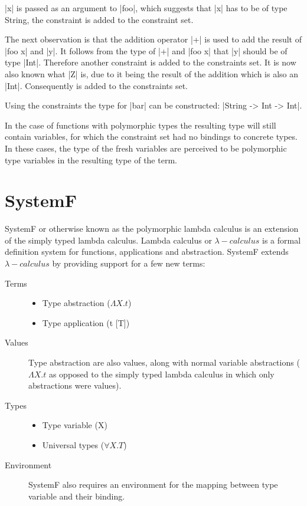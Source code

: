 |x| is passed as an argument to |foo|, which suggests that |x| has to be of type String, the constraint  is added to the constraint set.

The next observation is that the addition operator |+| is used to add the result of |foo x| and |y|. It follows from the type of |+| and |foo x| that |y| should be of type |Int|. Therefore another constraint  is added to the constraints set. It is now also known what |Z| is, due to it being the result of the addition which is also an |Int|. Consequently  is added to the constraints set.

Using the constraints {} the type for |bar| can be constructed: |String -> Int -> Int|.

In the case of functions with polymorphic types the resulting type will still contain variables, for which the constraint set had no bindings to concrete types. In these cases, the type of the fresh variables are perceived to be polymorphic type variables in the resulting type of the term.

\section{SystemF}
\label{SystemF}
SystemF or otherwise known as the polymorphic lambda calculus is an extension of the simply typed lambda calculus. Lambda calculus or $\lambda-calculus$  is a formal definition system for functions, applications and abstraction. SystemF extends $\lambda-calculus$ by providing support for a few new terms:

\begin{description}
\item[Terms]{
	\begin{minipage}[t]{\linewidth}
		\begin{itemize}
			\item Type abstraction ($\Lambda X.t$)
			\item Type application (t [T])
		\end{itemize}
	\end{minipage}
}
\item[Values] Type abstraction are also values, along with normal variable abstractions ($\Lambda X.t$ as opposed to the simply typed lambda calculus in which only abstractions were values).
\item[Types]{ 
	\begin{minipage}[t]{\linewidth}
		\begin{itemize}
			\item Type variable (X)
			\item Universal types ($\forall X. T$)
		\end{itemize}
	\end{minipage}
}
\item[Environment] SystemF also requires an environment for the mapping between type variable and their binding.
\end{description}


